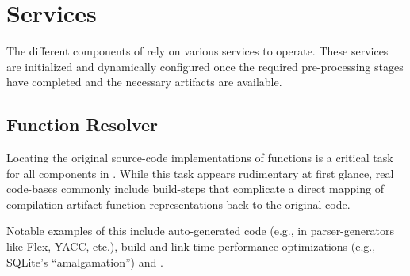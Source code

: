 \section{Services}

The different components of \artiphishell{} rely on various services to operate.
These services are initialized and dynamically configured once the required pre-processing stages have completed and the necessary artifacts are available.

\subsection{Function Resolver}

Locating the original source-code implementations of functions is a critical task for all components in \artiphishell{}.
While this task appears rudimentary at first glance, real code-bases commonly include build-steps that complicate a direct mapping of compilation-artifact function representations back to the original code.

Notable examples of this include auto-generated code (e.g., in parser-generators like Flex, YACC, etc.), build and link-time performance optimizations (e.g., SQLite's ``amalgamation'') and .